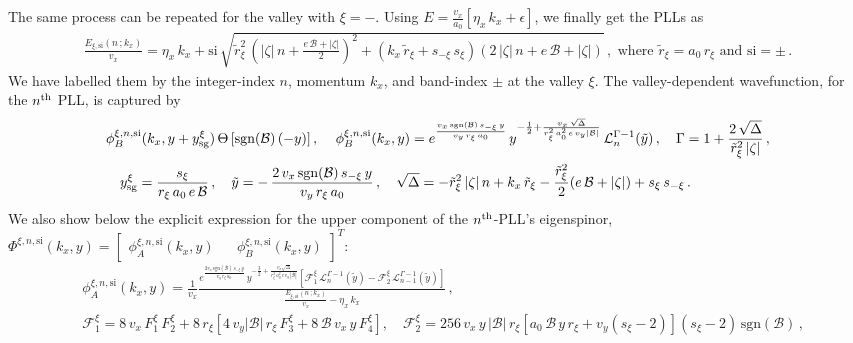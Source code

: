 \documentclass[aps,prb, onecolumn,nofootinbib,citeautoscript,10pt]{revtex4-2}
\def \nn{\nonumber \\}
\begin{document}
The same process can be repeated for the valley with $\xi =- $. Using $E= \frac{v_x} {a_0} \left[  \eta_x \,   k_x + \epsilon   \right ]$, we finally get the PLLs as
\begin{align}
\frac{E_{\xi, \text{si}}(n\, ; k_x) } {v_x} =  
\eta_x \,   k_x + \text{si} \,
\sqrt{\tilde r_\xi^2 \, \left( |\zeta | \, n
+ \frac{e \, \mathcal B+|\zeta|}{2} \right)^2
+ \left (k_x \, \tilde r_\xi + s_{-\xi} \, s_\xi \right )
\left (2 \, |\zeta |\, n + e \, \mathcal B+|\zeta| \right )}  \,,
\text{ where } \tilde{r}_\xi = a_0 \, r_\xi \text{ and } \text{si} =\pm\,.
\end{align}
We have labelled them by the integer-index $n$, momentum $k_x$, and band-index $\pm$ at the valley $\xi$. The valley-dependent wavefunction, for the $n^{\rm th}$ PLL, is captured by
\begin{align}
& \phi_B^{\xi,n, \text{si}} (k_x, y+ y^\xi_{\rm sg}) \, \Theta \left[ \text{sgn}(\mathcal B ) \left(- y\right)  \right],\,
\quad
 \phi_B^{\xi, n, \text{si}} (k_x, y) = e^{\frac{ v_x \, \text{sgn} (\mathcal B) \,s_{- \xi}\, y} { v_y \, r_\xi\, a_0 }} \, 
y^{-\frac{1}{2}+{\frac{ v_x \,\sqrt{\Delta}}{ r_\xi^2\, a_0^2\, e  \, v_y  \left |{\mathcal B}  \right |}}} \, 
{\mathcal L}^{\Gamma-1}_{n}(\tilde y)\,, 
\quad  \Gamma = 1+ \frac{2 \,\sqrt{\Delta }}{\tilde  r_\xi^2 \, |\zeta|} \,,\nn
& \quad  y^\xi_{\rm sg} = \frac{s_\xi } {r_\xi \,a_0\,  e\, {\mathcal B}}\,,\quad
\tilde y = -\, \frac{ 2\, v_x \, \text{sgn} (\mathcal B) \,s_{-\xi}\, y} 
{ v_y \,r_\xi \, a_0 }\,, \quad
\sqrt{\Delta}=-{\tilde r}_\xi^2 \, |\zeta |\, n + k_x \, {\tilde r}_\xi -\frac{\tilde r_\xi^2}{2}
(e \, \mathcal B + |\zeta|)+s_{\xi} \, s_{-\xi} \,.
\end{align}
We also show below the explicit expression for the upper component of the $n^{\rm th}$-PLL's eigenspinor, $ \Phi^{\xi, n, \text{si}} (k_x, y) = \begin{bmatrix}
\phi_A^{\xi, n, \text{si}}  (k_x, y) && \phi_B^{\xi, n, \text{si}}  (k_x, y)  \end{bmatrix}^T $:
\begin{align}
\label{eqphia}
& \phi_A^{\xi, n, \text{si}} (k_x, y)  =  \frac{1}{v_x} \frac{
e^{\frac{2v_x \,\mathrm{sgn}(\mathcal{B})\, s_{-\xi}\, y}{v_y\, r_\xi\, a_0}}
\, y^{-\frac{3}{2} + 
\frac{v_x \sqrt{\Delta}}{r_{\xi}^2\, a_0^2\, e\, v_y\, \left|\mathcal{B}\right|}}
\left[
{\mathcal{F}}_1^\xi\,\mathcal{L}_{n}^{\Gamma-1}(\tilde{y})
-
{\mathcal{F}}_2^\xi \,\mathcal{L}_{n-1}^{\Gamma-1}(\tilde{y})\right]}
{ \frac{E_{\xi, \text{si}}(n\, ; k_x)} {v_x} - \eta_x \,   k_x }\,,
\nn & {\mathcal{F}}_1^\xi   = 8 \, v_x  \, F_1^\xi  \, F_2^\xi + 8 \,  r_\xi
\left [ 4 \,v_y|\mathcal{B}|\,r_\xi\,F_3^\xi 
+ 8  \, \mathcal{B} \, v_x \,  y\,F_4^\xi  \right ],\quad
{\mathcal{F}}_2^\xi  = 256\, v_x\, y\, |\mathcal{B}|\, r_\xi
\left[a_0 \,\mathcal{B} \,y \,r_\xi + v_y \left (s_\xi-2 \right )\right]
(s_\xi-2)\, \text{sgn}(\mathcal{B})\,,
\end{align}
\end{document}
